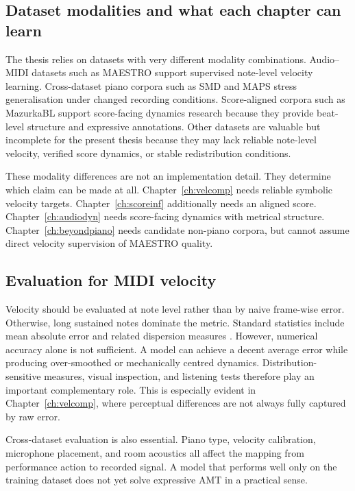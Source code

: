 \subsection{Dataset modalities and what each chapter can learn}
\label{sec:bg:dataeval:modalities}

The thesis relies on datasets with very different modality combinations. Audio--MIDI datasets such as MAESTRO support supervised note-level velocity learning. Cross-dataset piano corpora such as SMD and MAPS stress generalisation under changed recording conditions. Score-aligned corpora such as MazurkaBL support score-facing dynamics research because they provide beat-level structure and expressive annotations. Other datasets are valuable but incomplete for the present thesis because they may lack reliable note-level velocity, verified score dynamics, or stable redistribution conditions.

These modality differences are not an implementation detail. They determine which claim can be made at all. Chapter~\ref{ch:velcomp} needs reliable symbolic velocity targets. Chapter~\ref{ch:scoreinf} additionally needs an aligned score. Chapter~\ref{ch:audiodyn} needs score-facing dynamics with metrical structure. Chapter~\ref{ch:beyondpiano} needs candidate non-piano corpora, but cannot assume direct velocity supervision of MAESTRO quality.

\subsection{Evaluation for MIDI velocity}
\label{sec:bg:dataeval:velocity}

Velocity should be evaluated at note level rather than by naive frame-wise error. Otherwise, long sustained notes dominate the metric. Standard statistics include mean absolute error and related dispersion measures \cite{kuo2021velocity,kim2024method}. However, numerical accuracy alone is not sufficient. A model can achieve a decent average error while producing over-smoothed or mechanically centred dynamics. Distribution-sensitive measures, visual inspection, and listening tests therefore play an important complementary role. This is especially evident in Chapter~\ref{ch:velcomp}, where perceptual differences are not always fully captured by raw error.

Cross-dataset evaluation is also essential. Piano type, velocity calibration, microphone placement, and room acoustics all affect the mapping from performance action to recorded signal. A model that performs well only on the training dataset does not yet solve expressive AMT in a practical sense.

